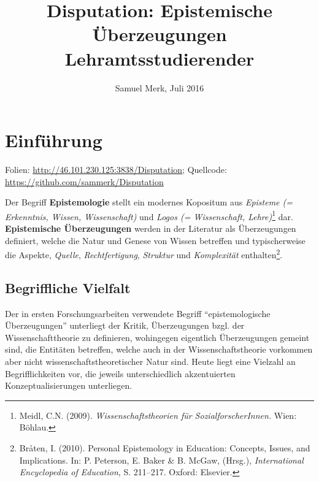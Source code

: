 \documentclass[]{tufte-handout}
\title{Disputation: Epistemische Überzeugungen Lehramtsstudierender}
\date{Samuel Merk, Juli 2016}
\begin{document}
\maketitle




\section{Einführung}\label{einfuhrung}

\begin{marginfigure}
Folien: \url{http://46.101.230.125:3838/Disputation}; Quellcode:
\url{https://github.com/sammerk/Disputation}
\end{marginfigure}

Der Begriff \textbf{Epistemologie} stellt ein modernes Kopositum aus
\emph{Episteme (= Erkenntnis, Wissen, Wissenschaft)} und \emph{Logos (=
Wissenschaft, Lehre)}\footnote{Meidl, C.N. (2009).
  \emph{Wissenschaftstheorien für SozialforscherInnen.} Wien: Böhlau.}
dar. \textbf{Epistemische Überzeugungen} werden in der Literatur als
Überzeugungen definiert, welche die Natur und Genese von Wissen
betreffen und typischerweise die Aspekte, \emph{Quelle},
\emph{Rechtfertigung}, \emph{Struktur} und \emph{Komplexität}
enthalten\footnote{Bråten, I. (2010). Personal Epistemology in
  Education: Concepts, Issues, and Implications. In: P. Peterson, E.
  Baker \& B. McGaw, (Hrsg.), \emph{International Encyclopedia of
  Education}, S. 211--217. Oxford: Elsevier.}.

\subsection{Begriffliche Vielfalt}\label{begriffliche-vielfalt}

Der in ersten Forschungsarbeiten verwendete Begriff ``epistemologische
Überzeugungen'' unterliegt der Kritik, Überzeugungen bzgl. der
Wissenschafttheorie zu definieren, wohingegen eigentlich Überzeugungen
gemeint sind, die Entitäten betreffen, welche auch in der
Wissenschaftstheorie vorkommen aber nicht wissenschaftstheoretischer
Natur sind. Heute liegt eine Vielzahl an Begrifflichkeiten vor, die
jeweils unterschiedlich akzentuierten Konzeptualisierungen unterliegen.
\end{document}
